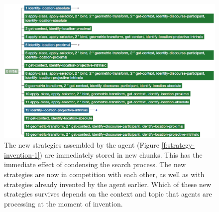 \begin{figure}
\begin{center}
\includegraphics[width=1.0\columnwidth]{figs/conceptualization-strategy-invention-2.png}
\end{center}
\caption[Effect of new conceptualization strategies on the search process]{
The new strategies assembled by the agent (Figure \ref{f:strategy-invention-1})
are immediately stored in new chunks. This has the immediate effect of 
condensing the search process.
The new strategies are now in competition with each other, as well as with strategies 
already invented by the agent earlier. Which of these new strategies survives 
depends on the context and topic that agents are processing at the moment of invention.}
\label{f:strategy-invention-2}
\end{figure}

